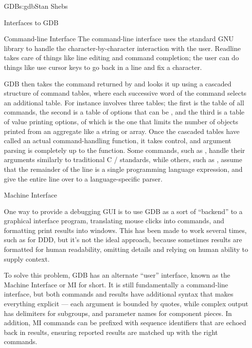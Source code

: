 \begin{aosachapter}{GDB}{s:gdb}{Stan Shebs}
\begin{aosasect1}{Interfaces to GDB}
\begin{aosasect2}{Command-line Interface}
The command-line interface uses the standard GNU library
 to handle the character-by-character interaction with
the user.  Readline takes care of things like line editing and command
completion; the user can do things like use cursor keys to go back in
a line and fix a character.

GDB then takes the command returned by  and looks it up
using a cascaded structure of command tables, where each successive
word of the command selects an additional table.  For instance
 involves three tables; the first is the
table of all commands, the second is a table of options that can be
, and the third is a table of value printing options, of
which  is the one that limits the number of objects
printed from an aggregate like a string or array.  Once the cascaded
tables have called an actual command-handling function, it takes
control, and argument parsing is completely up to the function.  Some
commands, such as , handle their arguments similarly to
traditional C / standards, while others, such as
, assume that the remainder of the line is a single
programming language expression, and give the entire line over to a
language-specific parser.

\end{aosasect2}

\begin{aosasect2}{Machine Interface}

One way to provide a debugging GUI is to use GDB as a sort of
``backend'' to a graphical interface program, translating mouse clicks
into commands, and formatting print results into windows.  This has
been made to work several times, such as for DDD, but it's not the
ideal approach, because sometimes results are formatted for human
readability, omitting details and relying on human ability to supply
context.

To solve this problem, GDB has an alternate ``user'' interface, known
as the Machine Interface or MI for short.  It is still fundamentally a
command-line interface, but both commands and results have additional
syntax that makes everything explicit --- each argument is bounded by
quotes, while complex output has delimiters for subgroups, and
parameter names for component pieces.  In addition, MI commands can be
prefixed with sequence identifiers that are echoed back in results,
ensuring reported results are matched up with the right commands.


\end{aosasect2}
\end{aosasect1}
\end{aosachapter}
